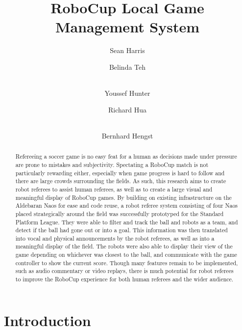 \documentclass[runningheads,a4paper]{llncs}
\begin{document}
\mainmatter

\title{RoboCup Local Game Management System}


\author{Sean Harris  \and Belinda Teh \and \\
    Youssef Hunter \and Richard Hua \and \\
    Bernhard Hengst}



\maketitle


\begin{abstract}
Refereeing a soccer game is no easy feat for a human as decisions made under pressure are prone to mistakes and subjectivity. Spectating a RoboCup match is not particularly rewarding either, especially when game progress is hard to follow and there are large crowds surrounding the fields. As such, this research aims to create robot referees to assist human referees, as well as to create a large visual and meaningful display of RoboCup games. By building on existing infrastructure on the Aldebaran Naos for ease and code reuse, a robot referee system consisting of four Naos placed strategically around the field was successfully prototyped for the Standard Platform League. They were able to filter and track the ball and robots as a team, and detect if the ball had gone out or into a goal. This information was then translated into vocal and physical announcements by the robot referees, as well as into a meaningful display of the field. The robots were also able to display their view of the game depending on whichever was closest to the ball, and communicate with the game controller to show the current score. Though many features remain to be implemented, such as audio commentary or video replays, there is much potential for robot referees to improve the RoboCup experience for both human referees and the wider audience.
\end{abstract}


\section{Introduction}
\end{document}
